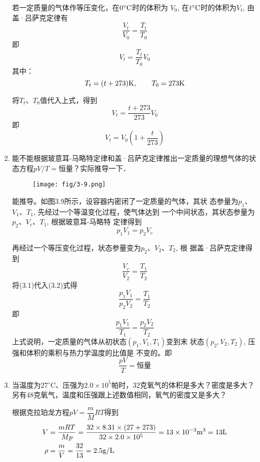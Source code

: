 \begin{enumerate}
\begin{solution}
    若一定质量的气体作等压变化，在$0^{\circ}{\rm C}$时的体积为
    $V_0$, 在$t^{\circ}{\rm C}$时的体积为$V_t$, 由盖·吕萨克定律有
\[\frac{V_t}{V_0}=\frac{T_t}{T_0}\]
即\[V_t=\frac{T_t}{T_0}V_0\]
其中：
\[T_t=(t+273){\rm K},\qquad T_0=273{\rm K}\]

将$T_t$、$T_0$值代入上式，得到
\[V_t=\frac{t+273}{273}V_0\]
即
\[V_t=V_0\left(1+\frac{t}{273}\right) \]


\end{solution}
\item 能不能根据玻意耳-马略特定律和盖·吕萨克定律推出一定质量的理想气体的状态方程$pV/T=$恒量？实际推导一下．

\begin{figure}[htp]
    \centering
\texttt{[image: fig/3-9.png]}
    \caption{}
\end{figure}

\begin{solution}
    能推导。如图3.9所示，设容器内密闭了一定质量的气体，其状
    态参量为$p_1$、$V_1$、$T_1$, 先经过一个等温变化过程，使气体达到
    一个中间状态，其状态参量为$p_2$、$V_c$、$T_1$, 根据玻意耳-马略特
    定律得到
\begin{equation}
    p_1V_1=p_2V_c
\end{equation}

再经过一个等压变化过程，状态参量变为$p_2$、$V_2$、$T_2$, 根
据盖·吕萨克定律得到
\begin{equation}
    \frac{V_c}{V_2}=\frac{T_1}{T_2}
\end{equation}
将(3.1)代入(3.2)式得
\[\frac{p_1V_1}{p_2V_2}=\frac{T_1}{T_2}\]
即
\[\frac{p_1V_1}{T_1}=\frac{p_2V_2}{T_2}\]
上式说明，一定质量的气体从初状态$(p_1,V_1,T_1)$变到末
状态$(p_2,V_2,T_2)$, 压强和体积的乘积与热力学温度的比值是
不变的。即
\[\frac{pV}{T}=\text{恒量}\]
\end{solution}
\item 当温度为27$^\circ$C、压强为$2.0\times 10^5$帕时，32克氧气的体积是多大？密度是多大？另有48克氧气，温度和压强跟上述数值相同，氧气的密度又是多大？	

\begin{solution}
    根据克拉珀龙方程$pV=\dfrac{m}{M}RT$得到
\[\begin{split}
    V&=\frac{mRT}{Mp}=\frac{32\times 8.31\times (27+273)}{32\times 2.0\times 10^5}=13\times 10^{-3}{\rm m^3}=13{\rm L}\\
    \rho&=\frac{m}{V}=\frac{32}{13}=2.5{\rm g/L}
\end{split}\]


\end{solution}
\end{enumerate}
